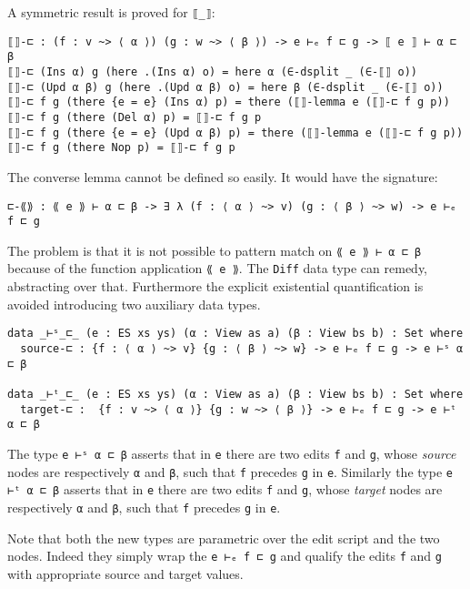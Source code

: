 \documentclass[../Thesis.tex]{subfiles}
\begin{document}
	A symmetric result is proved for \texttt{⟦\_⟧}:
\begin{verbatim}
⟦⟧-⊏ : (f : v ~> ⟨ α ⟩) (g : w ~> ⟨ β ⟩) -> e ⊢ₑ f ⊏ g -> ⟦ e ⟧ ⊢ α ⊏ β
⟦⟧-⊏ (Ins α) g (here .(Ins α) o) = here α (∈-dsplit _ (∈-⟦⟧ o))
⟦⟧-⊏ (Upd α β) g (here .(Upd α β) o) = here β (∈-dsplit _ (∈-⟦⟧ o))
⟦⟧-⊏ f g (there {e = e} (Ins α) p) = there (⟦⟧-lemma e (⟦⟧-⊏ f g p))
⟦⟧-⊏ f g (there (Del α) p) = ⟦⟧-⊏ f g p
⟦⟧-⊏ f g (there {e = e} (Upd α β) p) = there (⟦⟧-lemma e (⟦⟧-⊏ f g p))
⟦⟧-⊏ f g (there Nop p) = ⟦⟧-⊏ f g p
\end{verbatim}
	
	The converse lemma cannot be defined so easily.
	It would have the signature:
\begin{verbatim}
⊏-⟪⟫ : ⟪ e ⟫ ⊢ α ⊏ β -> ∃ λ (f : ⟨ α ⟩ ~> v) (g : ⟨ β ⟩ ~> w) -> e ⊢ₑ f ⊏ g 
\end{verbatim}
	
	The problem is that it is not possible to pattern match on 
	\texttt{⟪ e ⟫ ⊢ α ⊏ β} because of the function application \texttt{⟪ e ⟫}.
	The \texttt{Diff} data type can remedy, abstracting over that.
	Furthermore the explicit existential quantification is avoided introducing
	two auxiliary data types.
	 
\begin{verbatim}
data _⊢ˢ_⊏_ (e : ES xs ys) (α : View as a) (β : View bs b) : Set where
  source-⊏ : {f : ⟨ α ⟩ ~> v} {g : ⟨ β ⟩ ~> w} -> e ⊢ₑ f ⊏ g -> e ⊢ˢ α ⊏ β 

data _⊢ᵗ_⊏_ (e : ES xs ys) (α : View as a) (β : View bs b) : Set where
  target-⊏ :  {f : v ~> ⟨ α ⟩} {g : w ~> ⟨ β ⟩} -> e ⊢ₑ f ⊏ g -> e ⊢ᵗ α ⊏ β
\end{verbatim}

	The type \texttt{e ⊢ˢ α ⊏ β} asserts that in \texttt{e} there are two
	edits \texttt{f} and \texttt{g}, whose \emph{source} nodes are respectively 
	\texttt{α} 	and \texttt{β}, such that \texttt{f} precedes \texttt{g} in \texttt{e}.
	Similarly the type \texttt{e ⊢ᵗ α ⊏ β} asserts that in \texttt{e} there are two
	edits \texttt{f} and \texttt{g}, whose \emph{target} nodes are respectively 
	\texttt{α} 	and \texttt{β}, such that \texttt{f} precedes \texttt{g} in \texttt{e}.
	
	Note that both the new types are parametric over the edit script and the 
	two nodes. Indeed they simply wrap the \texttt{e ⊢ₑ f ⊏ g} and
	qualify the edits \texttt{f} and \texttt{g} with appropriate source and
	target values.
	
\end{document}
